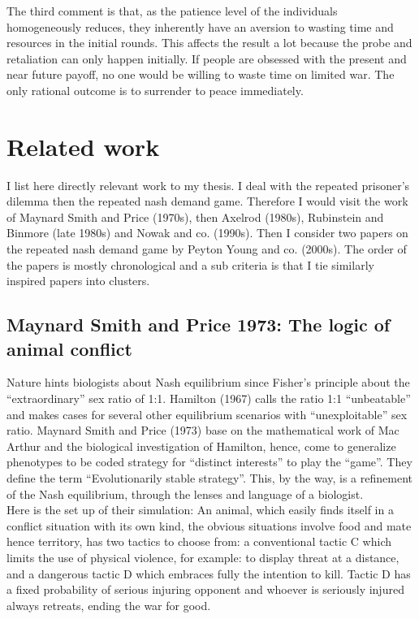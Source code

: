 \documentclass[12.5pt]{report}
\begin{document}
The third comment is that, as the patience level of the individuals homogeneously reduces, they inherently have an aversion to wasting time and resources in the initial rounds. This affects the result a lot because the probe and retaliation can only happen initially. If people are obsessed with the present and near future payoff, no one would be willing to waste time on limited war. The only rational outcome is to surrender to peace immediately.\\



\chapter{Related work}
I list here directly relevant work to my thesis. I deal with the repeated prisoner’s dilemma then the repeated nash demand game. Therefore I would visit the work of Maynard Smith and Price (1970s), then Axelrod (1980s), Rubinstein and Binmore (late 1980s) and Nowak and co. (1990s). Then I consider two papers on the repeated nash demand game by Peyton Young and co. (2000s). The order of the papers is mostly chronological and a sub criteria is that I tie similarly inspired papers into clusters.

\section{Maynard Smith and Price 1973: The logic of animal conflict}

Nature hints biologists about Nash equilibrium since Fisher’s principle about the “extraordinary” sex ratio of 1:1. Hamilton (1967) calls the ratio 1:1 “unbeatable” and makes cases for several other equilibrium scenarios with “unexploitable” sex ratio. Maynard Smith and Price (1973) base on the mathematical work of Mac Arthur and the biological investigation of Hamilton, hence, come to generalize phenotypes to be coded strategy for “distinct interests” to play the “game”. They define the term “Evolutionarily stable strategy”. This, by the way, is a refinement of the Nash equilibrium, through the lenses and language of a biologist.\\

Here is the set up of their simulation:
An animal, which easily finds itself in a conflict situation with its own kind, the obvious situations involve food and mate hence territory, has two tactics to choose from: a conventional tactic C which limits the use of physical violence, for example: to display threat at a distance, and a dangerous tactic D which embraces fully the intention to kill. 
 Tactic D has a fixed probability of serious injuring opponent and whoever is seriously injured always retreats, ending the war for good.\\
\end{document}
